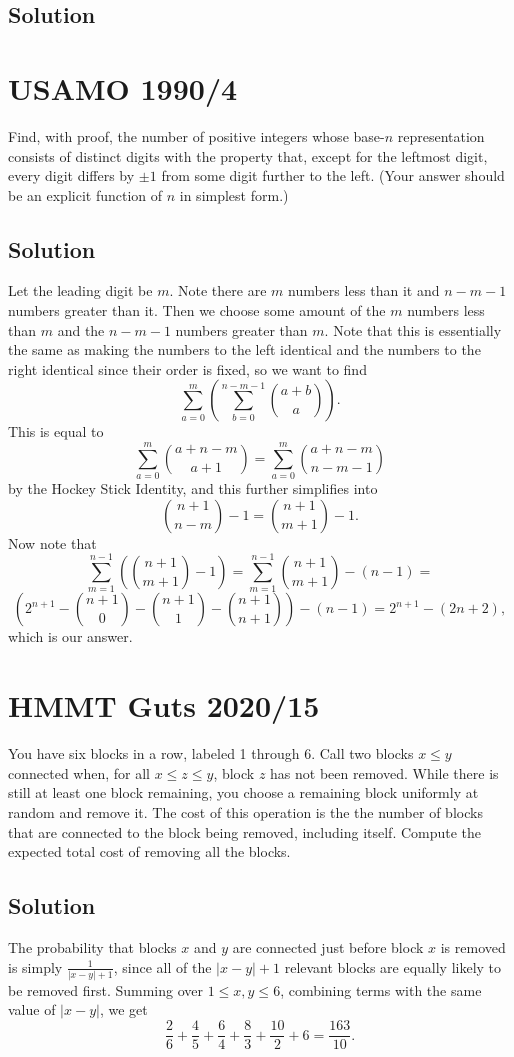 \documentclass[mast]{lucky}
\begin{document}
\subsection{Solution}

\pagebreak\section{USAMO 1990/4}
Find, with proof, the number of positive integers whose base-$n$ representation consists of distinct digits with the property that, except for the leftmost digit, every digit differs by $\pm 1$ from some digit further to the left. (Your answer should be an explicit function of $n$ in simplest form.)

\subsection{Solution}

Let the leading digit be $m.$ Note there are $m$ numbers less than it and $n-m-1$ numbers greater than it. Then we choose some amount of the $m$ numbers less than $m$ and the $n-m-1$ numbers greater than $m.$ Note that this is essentially the same as making the numbers to the left identical and the numbers to the right identical since their order is fixed, so we want to find
\[\sum_{a=0}^m\left(\sum_{b=0}^{n-m-1}\binom{a+b}{a}\right).\]This is equal to
\[\sum_{a=0}^m\binom{a+n-m}{a+1}=\sum_{a=0}^m\binom{a+n-m}{n-m-1}\]by the Hockey Stick Identity, and this further simplifies into
\[\binom{n+1}{n-m}-1=\binom{n+1}{m+1}-1.\]Now note that
\[\sum_{m=1}^{n-1}\left(\binom{n+1}{m+1}-1\right)=\sum_{m=1}^{n-1}\binom{n+1}{m+1}-(n-1)=\]
\[\left(2^{n+1}-\binom{n+1}{0}-\binom{n+1}{1}-\binom{n+1}{n+1}\right)-(n-1)=2^{n+1}-(2n+2),\]which is our answer.

\pagebreak\section{HMMT Guts 2020/15}
You have six blocks in a row, labeled 1 through 6. Call two blocks $x \le y$ connected when, for all $x \le z \le y$, block $z$ has not been removed. While there is still at least one block remaining, you choose a remaining block uniformly at random and remove it. The cost of this operation is the the number of blocks that are connected to the block being removed, including itself. Compute the expected total cost of removing all the blocks.
\subsection{Solution}
The probability that blocks $x$ and $y$ are connected just before block $x$ is removed is simply $\frac1{|x-y|+1}$, since
all of the $|x-y|+1$ relevant blocks are equally likely to be removed first. Summing over $1 \le x, y \le 6$,
combining terms with the same value of $|x-y|$, we get
$$\frac26 + \frac45 + \frac64 + \frac83 + \frac{10}2 + 6 = \frac{163}{10}.$$
\end{document}
